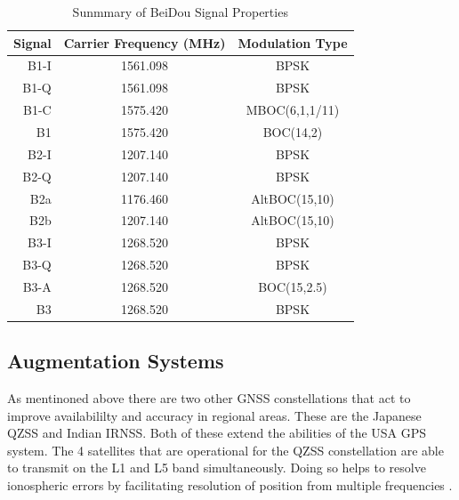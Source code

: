 \renewcommand{\arraystretch}{1.5}
\begin{table}
    \begin{center}
        \caption{Sunmmary of BeiDou Signal Properties}
        \label{tab:Beidou Signal}
        \begin{tabular}{ |r|c|c| }
            \hline
            \textbf{Signal} & \textbf{Carrier Frequency (MHz)} & \textbf{Modulation Type} \\
            \hline
            B1-I & 1561.098 & BPSK\\
            \hline
            B1-Q & 1561.098 & BPSK\\
            \hline
            B1-C & 1575.420 & MBOC(6,1,1/11)\\
            \hline
            B1 & 1575.420 & BOC(14,2)\\
            \hline 
            \hline
            B2-I & 1207.140 & BPSK\\
            \hline
            B2-Q & 1207.140 & BPSK\\
            \hline
            B2a & 1176.460 & AltBOC(15,10)\\
            \hline
            B2b & 1207.140 & AltBOC(15,10)\\
            \hline 
            \hline
            B3-I & 1268.520 & BPSK\\
            \hline
            B3-Q & 1268.520 & BPSK\\
            \hline
            B3-A & 1268.520 & BOC(15,2.5)\\
            \hline
            B3 & 1268.520 & BPSK\\
            \hline
        \end{tabular}
    \end{center}
\end{table}
\renewcommand{\arraystretch}{1}

\subsection{Augmentation Systems} \label{subsec:GNSS_OtherIntro}
As mentinoned above there are two other GNSS constellations that act to improve availabililty and accuracy in regional areas. These are the Japanese QZSS and Indian
IRNSS. Both of these extend the abilities of the USA GPS system. The 4 satellites that are operational for the QZSS constellation are able to transmit on the L1 and L5
band  simultaneously. Doing so helps to resolve ionospheric errors by facilitating resolution of position from multiple frequencies \cite{RN48}.

